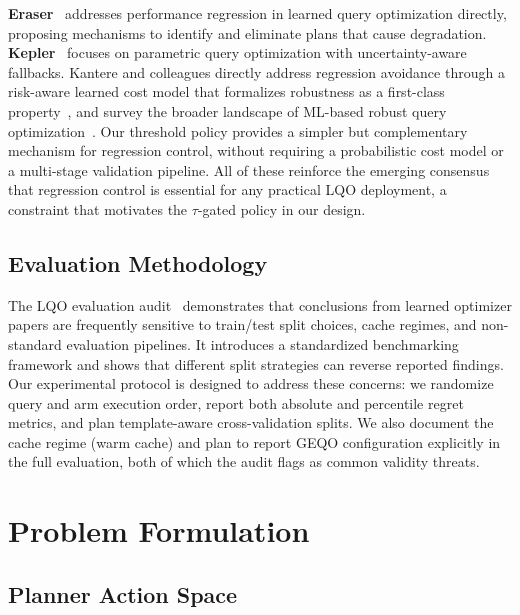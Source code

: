 \documentclass[sigconf,natbib=false]{article}
\newcommand{\threshold}{\tau}
\begin{document}
\textbf{Eraser}~\cite{Zhu2024Eraser} addresses performance regression in learned query
optimization directly, proposing mechanisms to identify and eliminate plans that cause
degradation. \textbf{Kepler}~\cite{Marcus2023Kepler} focuses on parametric query optimization
with uncertainty-aware fallbacks. Kantere and colleagues directly address regression
avoidance through a risk-aware learned cost model that formalizes robustness as a
first-class property~\cite{Kamali2024Roq}, and survey the broader landscape of
ML-based robust query optimization~\cite{Kamali2024ICDE}. Our threshold policy provides a
simpler but complementary mechanism for regression control, without requiring a probabilistic
cost model or a multi-stage validation pipeline. All of these reinforce the emerging consensus
that regression control is essential for any practical LQO deployment, a constraint that
motivates the $\threshold$-gated policy in our design.

\subsection{Evaluation Methodology}

The LQO evaluation audit~\cite{Lehmann2024} demonstrates that conclusions from learned
optimizer papers are frequently sensitive to train/test split choices, cache regimes, and
non-standard evaluation pipelines. It introduces a standardized benchmarking framework and
shows that different split strategies can reverse reported findings. Our experimental protocol
is designed to address these concerns: we randomize query and arm execution order, report
both absolute and percentile regret metrics, and plan template-aware cross-validation splits.
We also document the cache regime (warm cache) and plan to report GEQO configuration
explicitly in the full evaluation, both of which the audit flags as common validity threats.

\section{Problem Formulation}
\label{sec:method}

\subsection{Planner Action Space}
\end{document}

